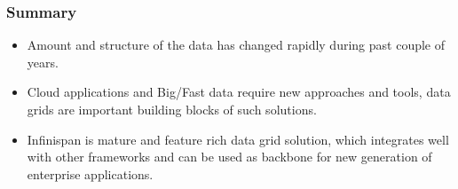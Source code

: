 \documentclass[10pt,utf8]{beamer}
\begin{document}

\begin{frame}
	\frametitle{Summary}
	\begin{itemize}
		\pause
		\item Amount and structure of the data has changed rapidly during past couple of years.
		\pause
		\item Cloud applications and Big/Fast data require new approaches and tools, data grids are important building blocks of such solutions.
		\pause
		\item Infinispan is mature and feature rich data grid solution, which integrates well with other frameworks and can be used as backbone for new 
	 generation of enterprise applications.
	\end{itemize}
\end{frame}
\end{document}
